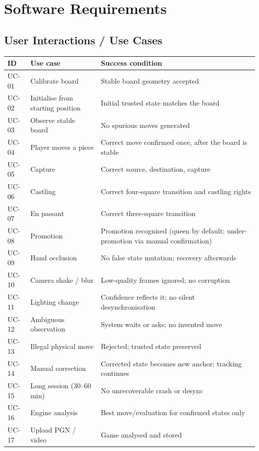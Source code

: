 \chapter{Software Requirements}
\section{User Interactions / Use Cases}
\begin{longtable}{p{}p{}p{}}
\toprule ID & Use case & Success condition\\ \midrule
UC-01 & Calibrate board & Stable board geometry accepted\\
UC-02 & Initialise from starting position & Initial trusted state matches the board\\
UC-03 & Observe stable board & No spurious moves generated\\
UC-04 & Player moves a piece & Correct move confirmed once, after the board is stable\\
UC-05 & Capture & Correct source, destination, capture\\
UC-06 & Castling & Correct four-square transition and castling rights\\
UC-07 & En passant & Correct three-square transition\\
UC-08 & Promotion & Promotion recognised (queen by default; under-promotion via manual confirmation)\\
UC-09 & Hand occlusion & No false state mutation; recovery afterwards\\
UC-10 & Camera shake / blur & Low-quality frames ignored; no corruption\\
UC-11 & Lighting change & Confidence reflects it; no silent desynchronisation\\
UC-12 & Ambiguous observation & System waits or asks; no invented move\\
UC-13 & Illegal physical move & Rejected; trusted state preserved\\
UC-14 & Manual correction & Corrected state becomes new anchor; tracking continues\\
UC-15 & Long session (30--60 min) & No unrecoverable crash or desync\\
UC-16 & Engine analysis & Best move/evaluation for confirmed states only\\
UC-17 & Upload PGN / video & Game analysed and stored\\
\bottomrule
\end{longtable}

